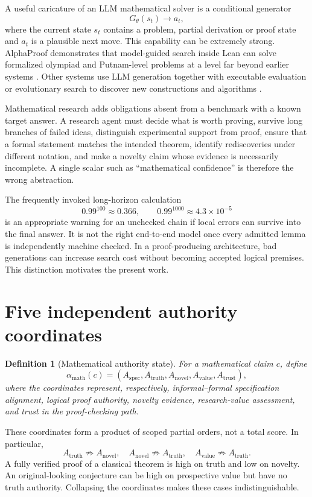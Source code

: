 \documentclass[11pt]{article}
\newtheorem{definition}{Definition}
\begin{document}
A useful caricature of an LLM mathematical solver is a conditional generator
\[
G_\theta(s_t)\rightarrow a_t,
\]
where the current state $s_t$ contains a problem, partial derivation or proof state and $a_t$ is a plausible next move. This capability can be extremely strong. AlphaProof demonstrates that model-guided search inside Lean can solve formalized olympiad and Putnam-level problems at a level far beyond earlier systems \cite{hubert2025}. Other systems use LLM generation together with executable evaluation or evolutionary search to discover new constructions and algorithms \cite{romera2024,novikov2025,georgiev2025}.

Mathematical research adds obligations absent from a benchmark with a known target answer. A research agent must decide what is worth proving, survive long branches of failed ideas, distinguish experimental support from proof, ensure that a formal statement matches the intended theorem, identify rediscoveries under different notation, and make a novelty claim whose evidence is necessarily incomplete. A single scalar such as ``mathematical confidence'' is therefore the wrong abstraction.

The frequently invoked long-horizon calculation
\[
0.99^{100}\approx 0.366,
\qquad
0.99^{1000}\approx 4.3\times 10^{-5}
\]
is an appropriate warning for an unchecked chain if local errors can survive into the final answer. It is not the right end-to-end model once every admitted lemma is independently machine checked. In a proof-producing architecture, bad generations can increase search cost without becoming accepted logical premises. This distinction motivates the present work.

\section{Five independent authority coordinates}

\begin{definition}[Mathematical authority state]
For a mathematical claim $c$, define
\[
\alpha_{\mathrm{math}}(c)=
(A_{\mathrm{spec}},A_{\mathrm{truth}},A_{\mathrm{novel}},A_{\mathrm{value}},A_{\mathrm{trust}}),
\]
where the coordinates represent, respectively, informal--formal specification alignment, logical proof authority, novelty evidence, research-value assessment, and trust in the proof-checking path.
\end{definition}

These coordinates form a product of scoped partial orders, not a total score. In particular,
\[
A_{\mathrm{truth}}\not\Rightarrow A_{\mathrm{novel}},
\quad
A_{\mathrm{novel}}\not\Rightarrow A_{\mathrm{truth}},
\quad
A_{\mathrm{value}}\not\Rightarrow A_{\mathrm{truth}}.
\]
A fully verified proof of a classical theorem is high on truth and low on novelty. An original-looking conjecture can be high on prospective value but have no truth authority. Collapsing the coordinates makes these cases indistinguishable.
\end{document}
